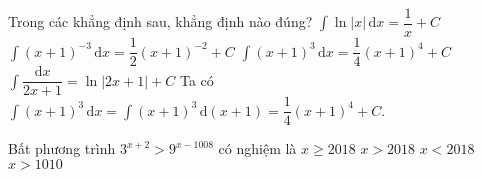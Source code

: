 \begin{ex}%
	Trong các khẳng định sau, khẳng định nào đúng?
	\choice
	{$\displaystyle \int \ln|x| \mathrm{\,d}x = \dfrac{1}{x}+C$}
	{$\displaystyle \int (x+1)^{-3} \mathrm{\,d}x = \dfrac{1}{2} (x+1)^{-2} + C$}
	{\True $\displaystyle \int (x+1)^3 \mathrm{\,d}x = \dfrac{1}{4} (x+1)^4 + C$}
	{$\displaystyle \int \dfrac{\mathrm{d}x}{2x+1} = \ln|2x+1|+C$}
	\loigiai 
	{
		Ta có $\displaystyle \int (x+1)^3 \mathrm{\,d}x = \displaystyle \int (x+1)^3 \mathrm{\,d}(x+1) = \dfrac{1}{4} (x+1)^4 + C$.
	}
\end{ex}
\begin{ex}%
Bất phương trình $3^{x+2} > 9^{x-1008}$ có nghiệm là 
\choice
{$x \ge 2018$}	
{$x > 2018$}	
{\True $x < 2018$}	
{$x > 1010$}
\end{ex}

